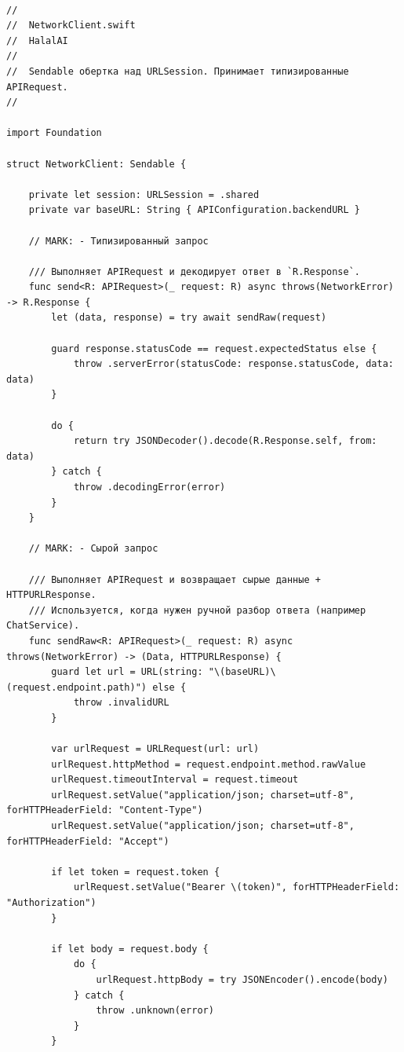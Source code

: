 \begin{lstlisting}[basicstyle=\tiny\ttfamily,breaklines=true]

//
//  NetworkClient.swift
//  HalalAI
//
//  Sendable обертка над URLSession. Принимает типизированные APIRequest.
//

import Foundation

struct NetworkClient: Sendable {

    private let session: URLSession = .shared
    private var baseURL: String { APIConfiguration.backendURL }

    // MARK: - Типизированный запрос

    /// Выполняет APIRequest и декодирует ответ в `R.Response`.
    func send<R: APIRequest>(_ request: R) async throws(NetworkError) -> R.Response {
        let (data, response) = try await sendRaw(request)

        guard response.statusCode == request.expectedStatus else {
            throw .serverError(statusCode: response.statusCode, data: data)
        }

        do {
            return try JSONDecoder().decode(R.Response.self, from: data)
        } catch {
            throw .decodingError(error)
        }
    }

    // MARK: - Сырой запрос

    /// Выполняет APIRequest и возвращает сырые данные + HTTPURLResponse.
    /// Используется, когда нужен ручной разбор ответа (например ChatService).
    func sendRaw<R: APIRequest>(_ request: R) async throws(NetworkError) -> (Data, HTTPURLResponse) {
        guard let url = URL(string: "\(baseURL)\(request.endpoint.path)") else {
            throw .invalidURL
        }

        var urlRequest = URLRequest(url: url)
        urlRequest.httpMethod = request.endpoint.method.rawValue
        urlRequest.timeoutInterval = request.timeout
        urlRequest.setValue("application/json; charset=utf-8", forHTTPHeaderField: "Content-Type")
        urlRequest.setValue("application/json; charset=utf-8", forHTTPHeaderField: "Accept")

        if let token = request.token {
            urlRequest.setValue("Bearer \(token)", forHTTPHeaderField: "Authorization")
        }

        if let body = request.body {
            do {
                urlRequest.httpBody = try JSONEncoder().encode(body)
            } catch {
                throw .unknown(error)
            }
        }


\end{lstlisting}
